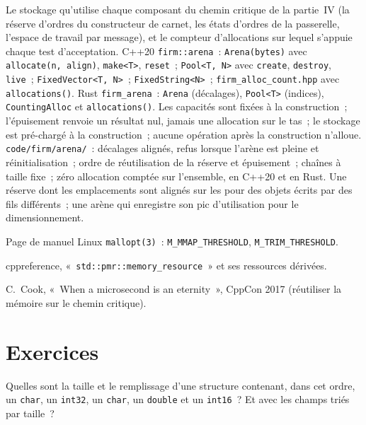 \begin{build}
 Le stockage qu'utilise chaque composant du chemin critique de la partie~IV (la réserve d'ordres du constructeur de carnet, les
états d'ordres de la passerelle, l'espace de travail par message), et le compteur d'allocations sur lequel s'appuie chaque test d'acceptation.
 C++20 \texttt{firm::arena}~: \texttt{Arena(bytes)} avec \texttt{allocate(n, align)}, \texttt{make<T>},
\texttt{reset}~; \texttt{Pool<T, N>} avec \texttt{create}, \texttt{destroy}, \texttt{live}~; \texttt{FixedVector<T, N>}~;
\texttt{FixedString<N>}~; \texttt{firm\_alloc\_count.hpp} avec \texttt{allocations()}. Rust \texttt{firm\_arena}~:
\texttt{Arena} (décalages), \texttt{Pool<T>} (indices), \texttt{CountingAlloc} et \texttt{allocations()}.
 Les capacités sont fixées à la construction~; l'épuisement renvoie un résultat nul, jamais une allocation sur le tas~; le stockage est
pré-chargé à la construction~; aucune opération après la construction n'alloue.
 \texttt{code/firm/arena/}~: décalages alignés, refus lorsque l'arène est pleine et réinitialisation~; ordre de réutilisation de la réserve et
épuisement~; chaînes à taille fixe~; zéro allocation comptée sur l'ensemble, en C++20 et en Rust.
 Une réserve dont les emplacements sont alignés sur les  pour des objets écrits par des fils différents~; une arène qui
enregistre son pic d'utilisation pour le dimensionnement.
\end{build}

\begin{omsources}
\item Page de manuel Linux \texttt{mallopt(3)}~: \texttt{M\_MMAP\_THRESHOLD}, \texttt{M\_TRIM\_THRESHOLD}.
\item cppreference, «~\texttt{std::pmr::memory\_resource}~» et ses ressources dérivées.
\item C.~Cook, «~When a microsecond is an eternity~», CppCon 2017 (réutiliser la mémoire sur le chemin critique).
\end{omsources}

\section{Exercices}

\begin{exercise}[$\star$]\label{exo:ll:cpp-for-latency-i-memory:1}
Quelles sont la taille et le remplissage d'une structure contenant, dans cet ordre, un \texttt{char}, un \texttt{int32}, un \texttt{char},
un \texttt{double} et un \texttt{int16}~? Et avec les champs triés par taille~?
\end{exercise}


